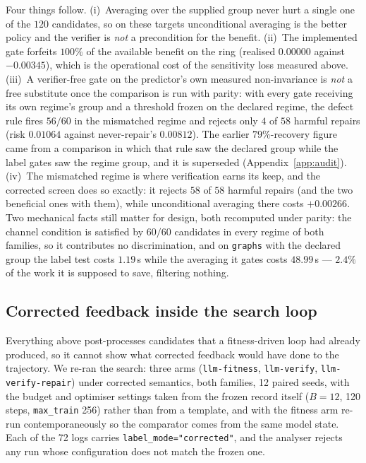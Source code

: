 \documentclass[11pt]{article}
\begin{document}
Four things follow. (i)~Averaging over the supplied group never hurt a single one of the
$120$ candidates, so on these targets unconditional averaging is the better policy and the
verifier is \emph{not} a precondition for the benefit. (ii)~The implemented gate forfeits
$100\%$ of the available benefit on the ring (realised $0.00000$ against $-0.00345$), which
is the operational cost of the sensitivity loss measured above. (iii)~A verifier-free gate on
the predictor's own measured non-invariance is \emph{not} a free substitute once the comparison
is run with parity: with every gate receiving its own regime's group and a threshold frozen on
the declared regime, the defect rule fires $56/60$ in the mismatched regime and rejects only
$4$ of $58$ harmful repairs (risk $0.01064$ against never-repair's $0.00812$). The earlier
$79\%$-recovery figure came from a comparison in which that rule saw the declared group while
the label gates saw the regime group, and it is superseded (Appendix~\ref{app:audit}).
(iv)~The mismatched regime is where verification earns its keep, and the corrected screen does
so exactly: it rejects $58$ of $58$ harmful repairs (and the two beneficial ones with them),
while unconditional averaging there costs $+0.00266$. Two mechanical facts still matter for
design, both recomputed under parity: the channel condition is satisfied by $60/60$ candidates
in every regime of both families, so it contributes no discrimination, and on \texttt{graphs}
with the declared group the label test costs $1.19$\,s while the averaging it gates costs
$48.99$\,s --- $2.4\%$ of the work it is supposed to save, filtering nothing.

\subsection{Corrected feedback inside the search loop}
\label{sec:correctedsearch}

Everything above post-processes candidates that a fitness-driven loop had already produced, so
it cannot show what corrected feedback would have done to the trajectory. We re-ran the search:
three arms (\texttt{llm-fitness}, \texttt{llm-verify}, \texttt{llm-verify-repair}) under corrected
semantics, both families, 12 paired seeds, with the budget and optimiser settings taken from the
frozen record itself ($B{=}12$, 120 steps, \texttt{max\_train} 256) rather than from a template,
and with the fitness arm re-run contemporaneously so the comparator comes from the same model
state. Each of the 72 logs carries \texttt{label\_mode="corrected"}, and the analyser rejects any
run whose configuration does not match the frozen one.
\end{document}
